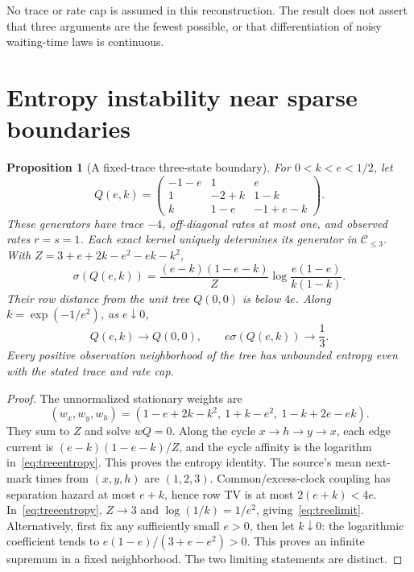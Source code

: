 \documentclass[aps,pre,onecolumn,11pt,longbibliography,notitlepage]{revtex4-2}
\newtheorem{proposition}[theorem]{Proposition}
\newcommand{\1}{\mathbf 1}
\newcommand{\C}{\mathcal C}
\newcommand{\sig}{\sigma}
\begin{document}
No trace or rate cap is assumed in this reconstruction. The result does not assert that three arguments are the fewest possible, or that differentiation of noisy waiting-time laws is continuous.



\section{Entropy instability near sparse boundaries}\label{sec:sparse}
\begin{proposition}[A fixed-trace three-state boundary]\label{prop:tree}
For $0<k<e<1/2$, let
\begin{equation}
 Q(e,k)=\begin{pmatrix}
 -1-e&1&e\\1&-2+k&1-k\\k&1-e&-1+e-k
 \end{pmatrix}.\label{eq:treefamily}
\end{equation}
These generators have trace $-4$, off-diagonal rates at most one, and observed rates $r=s=1$. Each exact kernel uniquely determines its generator in $\C_{\le3}$. With $Z=3+e+2k-e^2-ek-k^2$,
\begin{equation}
 \sig(Q(e,k))=\frac{(e-k)(1-e-k)}{Z}
 \log\frac{e(1-e)}{k(1-k)}.\label{eq:treeentropy}
\end{equation}
Their row distance from the unit tree $Q(0,0)$ is below $4e$. Along $k=\exp(-1/e^2)$, as $e\downarrow0$,
\begin{equation}
 Q(e,k)\longrightarrow Q(0,0),\qquad e\sig(Q(e,k))\longrightarrow\frac13.\label{eq:treelimit}
\end{equation}
Every positive observation neighborhood of the tree has unbounded entropy even with the stated trace and rate cap.
\end{proposition}

\begin{proof}
The unnormalized stationary weights are
\begin{equation}
 (w_x,w_y,w_h)=(1-e+2k-k^2,\ 1+k-e^2,\ 1-k+2e-ek).
\end{equation}
They sum to $Z$ and solve $wQ=0$. Along the cycle $x\to h\to y\to x$, each edge current is $(e-k)(1-e-k)/Z$, and the cycle affinity is the logarithm in~\eqref{eq:treeentropy}. This proves the entropy identity. The source's mean next-mark times from $(x,y,h)$ are $(1,2,3)$. Common/excess-clock coupling has separation hazard at most $e+k$, hence row TV is at most $2(e+k)<4e$. In~\eqref{eq:treeentropy}, $Z\to3$ and $\log(1/k)=1/e^2$, giving~\eqref{eq:treelimit}. Alternatively, first fix any sufficiently small $e>0$, then let $k\downarrow0$: the logarithmic coefficient tends to $e(1-e)/(3+e-e^2)>0$. This proves an infinite supremum in a fixed neighborhood. The two limiting statements are distinct.
\end{proof}
\end{document}
